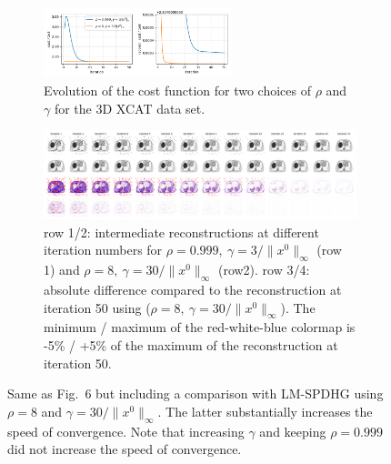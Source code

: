 \documentclass[10pt,twocolumn,twoside]{article}
\begin{document}
\begin{figure}
  \centering
  \begin{subfigure}[]{1.0\textwidth}
    \centering
    \includegraphics[width=0.6\textwidth]{./figs/xcat_TV_3e-2_4e7_rho_8_conv_metrics.png}
    \caption{Evolution of the cost function for two choices of $\rho$ and $\gamma$ for the 3D
             XCAT data set.}
  \end{subfigure}
  \vfill
  \begin{subfigure}[]{1.0\textwidth}
    \centering
    \includegraphics[width=1.0\textwidth]{./figs/xcat_TV_3e-2_4e7_rho_8_conv.png}
    \caption{row 1/2: intermediate reconstructions at different iteration numbers for
                      $\rho = 0.999, \ \gamma = 3/ \| x^0 \|_\infty$ (row 1) and
                      $\rho = 8, \ \gamma = 30/ \| x^0 \|_\infty$ (row2). 
             row 3/4: absolute difference compared to the reconstruction at iteration 50
                      using ($\rho = 8, \ \gamma = 30/ \| x^0 \|_\infty$).
                      The minimum / maximum of the red-white-blue colormap is -5\% / +5\%
                      of the maximum of the reconstruction at iteration 50.}
  \end{subfigure}
  \caption{Same as Fig.~6 but including a comparison with LM-SPDHG using $\rho = 8$ and 
           $\gamma = 30 / \| x^0 \|_\infty$. 
           The latter substantially increases the speed of convergence.
           Note that increasing $\gamma$ and keeping $\rho = 0.999$ did not increase the
           speed of convergence.}
\end{figure}
\end{document}
